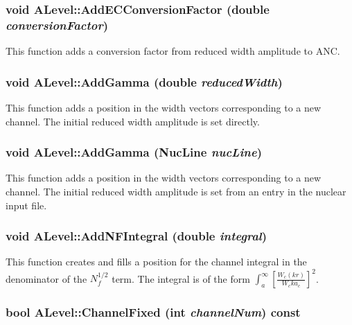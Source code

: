 \subsubsection{\setlength{\rightskip}{0pt plus 5cm}void ALevel::Add\-ECConversion\-Factor (double {\em conversion\-Factor})}\label{classALevel_fb03bc09889b8f81773eb05ccc11e54b}


This function adds a conversion factor from reduced width amplitude to ANC. 
\subsubsection{\setlength{\rightskip}{0pt plus 5cm}void ALevel::Add\-Gamma (double {\em reduced\-Width})}\label{classALevel_c7caa4d63534a97745d9b9507c46a05a}


This function adds a position in the width vectors corresponding to a new channel. The initial reduced width amplitude is set directly. 
\subsubsection{\setlength{\rightskip}{0pt plus 5cm}void ALevel::Add\-Gamma (Nuc\-Line {\em nuc\-Line})}\label{classALevel_972a2181abf39f8ebc035530bdf0a890}


This function adds a position in the width vectors corresponding to a new channel. The initial reduced width amplitude is set from an entry in the nuclear input file. 
\subsubsection{\setlength{\rightskip}{0pt plus 5cm}void ALevel::Add\-NFIntegral (double {\em integral})}\label{classALevel_18a1700f5bf7b91e240fb4c1307ffb27}


This function creates and fills a position for the channel integral in the denominator of the $N_f^{1/2}$ term. The integral is of the form $ \int_a^\infty \left[ \frac{W_c(kr)}{W_c{ka_c}} \right]^2 $. 
\subsubsection{\setlength{\rightskip}{0pt plus 5cm}bool ALevel::Channel\-Fixed (int {\em channel\-Num}) const}\label{classALevel_78daf0cd95cdef89c0a742fb796c70aa}


